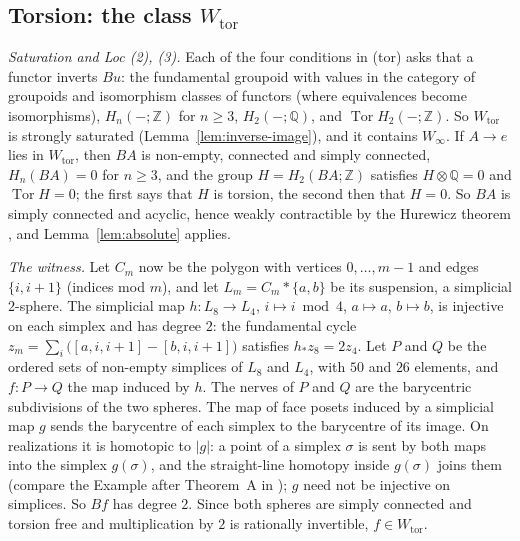 \documentclass[11pt,a4paper]{article}
\theoremstyle{definition}
\newcommand{\Winf}{W_{\infty}}
\newcommand{\Wtor}{W_{\mathrm{tor}}}
\newcommand{\Tor}{\operatorname{Tor}}
\newcommand{\Z}{\mathbb{Z}}
\newcommand{\Q}{\mathbb{Q}}
\begin{document}
\subsection{Torsion: the class \texorpdfstring{$\Wtor$}{W tor}}\label{subsec:wtor}

\emph{Saturation and Loc (2), (3).} Each of the four conditions in (tor) asks that a functor
inverts $Bu$: the fundamental groupoid with values in the category of groupoids and
isomorphism classes of functors (where equivalences become isomorphisms), $H_n(-;\Z)$ for
$n\ge3$, $H_2(-;\Q)$, and $\Tor H_2(-;\Z)$. So $\Wtor$ is strongly saturated
(Lemma~\ref{lem:inverse-image}), and it contains $\Winf$. If $A\to e$ lies in $\Wtor$, then
$BA$ is non-empty, connected and simply connected, $H_n(BA)=0$ for $n\ge3$, and the group
$H=H_2(BA;\Z)$ satisfies $H\otimes\Q=0$ and $\Tor H=0$; the first says that $H$ is torsion, the
second then that $H=0$. So $BA$ is simply connected and acyclic, hence weakly contractible by
the Hurewicz theorem \cite[Th.~4.32]{Hat02}, and Lemma~\ref{lem:absolute} applies.

\emph{The witness.} Let $C_m$ now be the polygon with vertices $0,\dots,m-1$ and edges
$\{i,i+1\}$ (indices mod $m$), and let $L_m=C_m*\{a,b\}$ be its suspension, a simplicial
$2$-sphere. The simplicial map $h\colon L_8\to L_4$, $i\mapsto i\bmod4$, $a\mapsto a$,
$b\mapsto b$, is injective on each simplex and has degree $2$: the fundamental cycle
$z_m=\sum_{i}\bigl([a,i,i+1]-[b,i,i+1]\bigr)$ satisfies $h_*z_8=2z_4$. Let $P$ and $Q$ be the
ordered sets of non-empty simplices of $L_8$ and $L_4$, with $50$ and $26$ elements, and
$f\colon P\to Q$ the map induced by $h$. The nerves of $P$ and $Q$ are the barycentric
subdivisions of the two spheres. The map of face posets induced by a simplicial map $g$ sends the
barycentre of each simplex to the barycentre of its image. On realizations it is homotopic to
$|g|$: a point of a simplex $\sigma$ is sent by both maps into the simplex $g(\sigma)$, and the
straight-line homotopy inside $g(\sigma)$ joins them (compare the Example after Theorem~A in
\cite[\S1]{Qui73}); $g$ need not be injective on simplices. So $Bf$ has degree $2$. Since both spheres are simply connected and torsion free and multiplication by $2$
is rationally invertible, $f\in\Wtor$.
\end{document}

